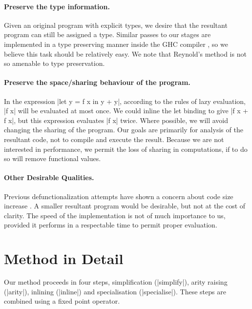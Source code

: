 \documentclass[preprint]{sigplanconf}
\begin{document}
\paragraph{Preserve the type information.} Given an original program with explicit types, we desire that the resultant program can still be assigned a type. Similar passes to our stages are implemented in a type preserving manner inside the GHC compiler \cite{ghc}, so we believe this task should be relatively easy. We note that Reynold's method is not so amenable to type preservation.

\paragraph{Preserve the space/sharing behaviour of the program.} In the expression |let y = f x in y + y|, according to the rules of lazy evaluation, |f x| will be evaluated at most once. We could inline the let binding to give |f x + f x|, but this expression evaluates |f x| twice. Where possible, we will avoid changing the sharing of the program. Our goals are primarily for analysis of the resultant code, not to compile and execute the result. Because we are not interested in performance, we permit the loss of sharing in computations, if to do so will remove functional values.

\paragraph{Other Desirable Qualities.} Previous defunctionalization attempts have shown a concern about code size increase \cite{chin:higher_order_removal}. A smaller resultant program would be desirable, but not at the cost of clarity. The speed of the implementation is not of much importance to us, provided it performs in a respectable time to permit proper evaluation.


\section{Method in Detail}
\label{sec:detailed}

\begin{comment}
\begin{code}
data Prog = Prog deriving Eq
simplify,arity,inline,specialise :: Prog -> Prog
\end{code}
\end{comment}

Our method proceeds in four steps, simplification (|simplify|), arity raising (|arity|), inlining (|inline|) and specialisation (|specialise|). These steps are combined using a fixed point operator.
\end{document}
